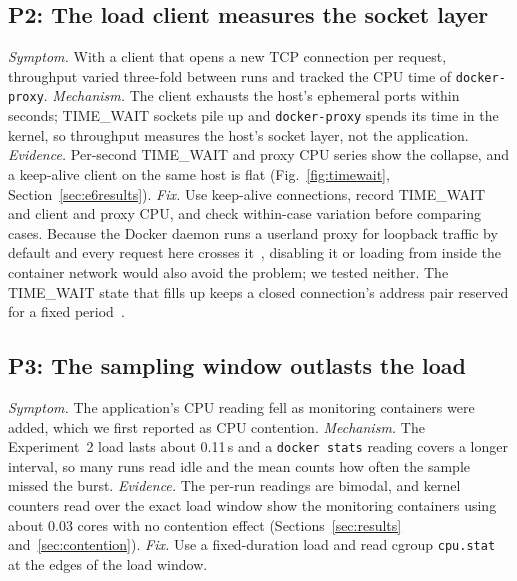 \documentclass[conference]{IEEEtran}
\begin{document}
\subsection{P2: The load client measures the socket layer}
\label{sec:p2}
\emph{Symptom.} With a client that opens a new TCP connection per request, throughput
varied three-fold between runs and tracked the CPU time of \texttt{docker-proxy}.
\emph{Mechanism.} The client exhausts the host's ephemeral ports within seconds; TIME\_WAIT
sockets pile up and \texttt{docker-proxy} spends its time in the kernel, so throughput
measures the host's socket layer, not the application. \emph{Evidence.} Per-second
TIME\_WAIT and proxy CPU series show the collapse, and a keep-alive client on the same host
is flat (Fig.~\ref{fig:timewait}, Section~\ref{sec:e6results}). \emph{Fix.} Use keep-alive
connections, record TIME\_WAIT and client and proxy CPU, and check within-case variation
before comparing cases. Because the Docker daemon runs a userland proxy for loopback traffic by default
and every request here crosses it~\cite{dockerd}, disabling it or loading from inside the
container network would also avoid the problem; we tested neither. The TIME\_WAIT state
that fills up keeps a closed connection's address pair reserved for a fixed
period~\cite{gont2011}.

\subsection{P3: The sampling window outlasts the load}
\label{sec:p3}
\emph{Symptom.} The application's CPU reading fell as monitoring containers were added,
which we first reported as CPU contention. \emph{Mechanism.} The Experiment~2 load lasts
about 0.11\,s and a \texttt{docker stats} reading covers a longer interval, so many runs
read idle and the mean counts how often the sample missed the burst. \emph{Evidence.} The
per-run readings are bimodal, and kernel counters read over the exact load window show the
monitoring containers using about 0.03 cores with no contention effect
(Sections~\ref{sec:results} and~\ref{sec:contention}). \emph{Fix.} Use a fixed-duration
load and read cgroup \texttt{cpu.stat} at the edges of the load window.
\end{document}
